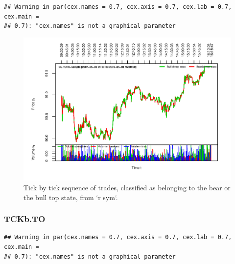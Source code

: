 \documentclass[]{article}
\begin{document}
\begin{verbatim}
## Warning in par(cex.names = 0.7, cex.axis = 0.7, cex.lab = 0.7, cex.main =
## 0.7): "cex.names" is not a graphical parameter
\end{verbatim}

\begin{figure}[H]
\includegraphics[width=\textwidth]{main_files/figure-latex/unnamed-chunk-44-1} \caption{Tick by tick sequence of trades, classified as belonging to the bear or the bull top state, from `r sym`.}\label{fig:unnamed-chunk-44}
\end{figure}

\newpage

\subsubsection{TCKb.TO}\label{tckb.to}

\begin{verbatim}
## Warning in par(cex.names = 0.7, cex.axis = 0.7, cex.lab = 0.7, cex.main =
## 0.7): "cex.names" is not a graphical parameter
\end{verbatim}
\end{document}
